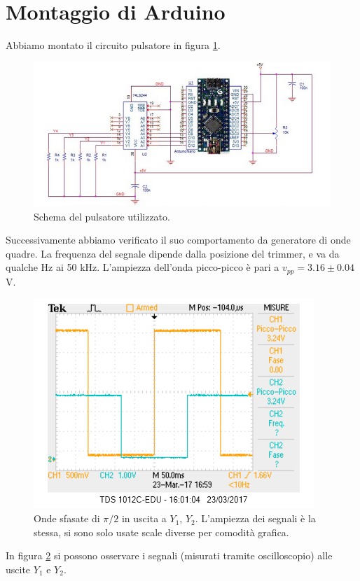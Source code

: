 \documentclass[10pt,a4paper]{article}
\begin{document}
\section{Montaggio di Arduino}
Abbiamo montato il circuito pulsatore in figura \ref{fig:arduino}.
\begin{figure}
\centering
\includegraphics[scale=0.7]{arduino.png}
\caption{Schema del pulsatore utilizzato.\label{fig:arduino}}
\end{figure}
Successivamente abbiamo verificato il suo comportamento da generatore di onde quadre. La frequenza del segnale dipende dalla posizione del trimmer, e va da qualche Hz ai 50 kHz. L'ampiezza dell'onda picco-picco è pari a $v_{pp}=3.16\pm 0.04$V.
\begin{figure}
\centering
\includegraphics[scale=0.7]{ondaardu.png}
\caption{Onde sfasate di $\pi/2$ in uscita a $Y_1$, $Y_2$. L'ampiezza dei segnali è la stessa, si sono solo usate scale diverse per comodità grafica.\label{fig:ondaardu}}
\end{figure}
In figura \ref{fig:ondaardu} si possono osservare i segnali (misurati tramite oscilloscopio) alle uscite $Y_1$ e $Y_2$.
\end{document}
